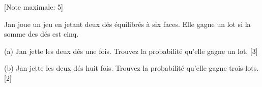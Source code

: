 \begin{question}
  \hspace*{\fill} [Note maximale: 5]\par
  \medskip
  \noindent Jan joue un jeu en jetant deux dés équilibrés à six faces. Elle gagne un lot si la somme des dés est cinq.\par
  \medskip
  (a) Jan jette les deux dés une fois. Trouvez la probabilité qu’elle gagne un lot.\hspace*{\fill} [3]\par
  \medskip
  (b) Jan jette les deux dés huit fois. Trouvez la probabilité qu’elle gagne trois lots.\hspace*{\fill} [2]\par

\end{question}

